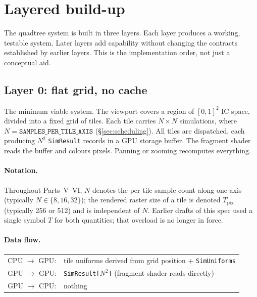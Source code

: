 \documentclass[11pt]{report}
\begin{document}
\section{Layered build-up}
\label{sec:layered_buildup}

The quadtree system is built in three layers. Each layer produces a working, testable system. Later layers add capability without changing the contracts established by earlier layers. This is the implementation order, not just a conceptual aid.

\subsection{Layer 0: flat grid, no cache}

The minimum viable system. The viewport covers a region of $[0,1]^2$ IC space, divided into a fixed grid of tiles. Each tile carries $N\times N$ simulations, where $N=\texttt{SAMPLES\_PER\_TILE\_AXIS}$ (\S\ref{sec:scheduling}). All tiles are dispatched, each producing $N^2$ \texttt{SimResult} records in a GPU storage buffer. The fragment shader reads the buffer and colours pixels. Panning or zooming recomputes everything.

\paragraph{Notation.} Throughout Parts~V--VI, $N$ denotes the per-tile sample count along one axis (typically $N\in\{8,16,32\}$); the rendered raster size of a tile is denoted $T_{\mathrm{pix}}$ (typically 256 or 512) and is independent of $N$. Earlier drafts of this spec used a single symbol $T$ for both quantities; that overload is no longer in force.

\paragraph{Data flow.}
\begin{center}
\begin{tabular}{ll}
CPU $\to$ GPU: & tile uniforms derived from grid position + \texttt{SimUniforms} \\
GPU $\to$ GPU: & \texttt{SimResult[$N^2$]} (fragment shader reads directly) \\
GPU $\to$ CPU: & nothing \\
\end{tabular}
\end{center}
\end{document}

